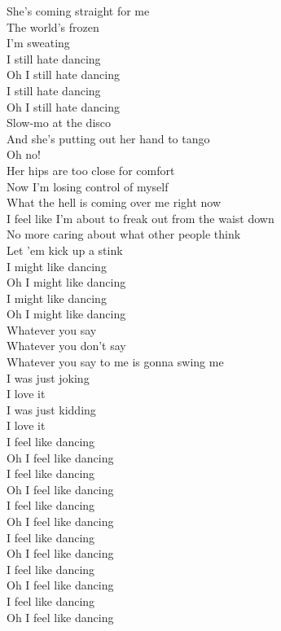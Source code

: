 She's coming straight for me\\
The world's frozen\\
I'm sweating\\

I still hate dancing\\
Oh I still hate dancing\\
I still hate dancing\\
Oh I still hate dancing\\

Slow-mo at the disco\\
And she's putting out her hand to tango\\
Oh no!\\
Her hips are too close for comfort\\
Now I'm losing control of myself\\
What the hell is coming over me right now\\
I feel like I'm about to freak out from the waist down\\
No more caring about what other people think\\
Let 'em kick up a stink\\

I might like dancing\\
Oh I might like dancing\\
I might like dancing\\
Oh I might like dancing\\

Whatever you say\\
Whatever you don't say\\
Whatever you say to me is gonna swing me\\

I was just joking\\
I love it\\
I was just kidding\\
I love it\\

I feel like dancing\\
Oh I feel like dancing\\
I feel like dancing\\
Oh I feel like dancing\\
I feel like dancing\\
Oh I feel like dancing\\
I feel like dancing\\
Oh I feel like dancing\\
I feel like dancing\\
Oh I feel like dancing\\
I feel like dancing\\
Oh I feel like dancing\\

